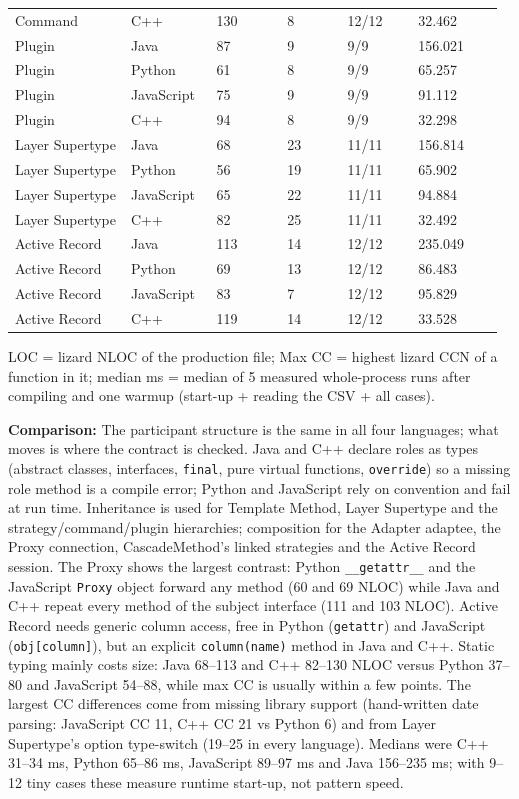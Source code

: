 \documentclass[11pt,a4paper]{article}
\newcommand{\field}[2]{\textbf{#1:} #2\par}
\begin{document}
{\begin{longtable}{@{}P{0.23\linewidth}P{0.17\linewidth}P{0.14\linewidth}P{0.12\linewidth}P{0.14\linewidth}P{0.17\linewidth}@{}}
Command & C++ & 130 & 8 & 12/12 & 32.462 \\
Plugin & Java & 87 & 9 & 9/9 & 156.021 \\
Plugin & Python & 61 & 8 & 9/9 & 65.257 \\
Plugin & JavaScript & 75 & 9 & 9/9 & 91.112 \\
Plugin & C++ & 94 & 8 & 9/9 & 32.298 \\
Layer Supertype & Java & 68 & 23 & 11/11 & 156.814 \\
Layer Supertype & Python & 56 & 19 & 11/11 & 65.902 \\
Layer Supertype & JavaScript & 65 & 22 & 11/11 & 94.884 \\
Layer Supertype & C++ & 82 & 25 & 11/11 & 32.492 \\
Active Record & Java & 113 & 14 & 12/12 & 235.049 \\
Active Record & Python & 69 & 13 & 12/12 & 86.483 \\
Active Record & JavaScript & 83 & 7 & 12/12 & 95.829 \\
Active Record & C++ & 119 & 14 & 12/12 & 33.528 \\
\bottomrule\end{longtable}}
LOC = lizard NLOC of the production file; Max CC = highest lizard CCN of a function in it; median ms = median of 5 measured whole-process runs after compiling and one warmup (start-up + reading the CSV + all cases).\par
\field{Comparison}{The participant structure is the same in all four languages; what moves is where the contract is checked. Java and C++ declare roles as types (abstract classes, interfaces, \texttt{final}, pure virtual functions, \texttt{override}) so a missing role method is a compile error; Python and JavaScript rely on convention and fail at run time. Inheritance is used for Template Method, Layer Supertype and the strategy/command/plugin hierarchies; composition for the Adapter adaptee, the Proxy connection, CascadeMethod's linked strategies and the Active Record session. The Proxy shows the largest contrast: Python \texttt{\_\allowbreak{}\_\allowbreak{}getattr\_\allowbreak{}\_\allowbreak{}} and the JavaScript \texttt{Proxy} object forward any method (60 and 69 NLOC) while Java and C++ repeat every method of the subject interface (111 and 103 NLOC). Active Record needs generic column access, free in Python (\texttt{getattr}) and JavaScript (\texttt{obj[column]}), but an explicit \texttt{column(name)} method in Java and C++. Static typing mainly costs size: Java 68--113 and C++ 82--130 NLOC versus Python 37--80 and JavaScript 54--88, while max CC is usually within a few points. The largest CC differences come from missing library support (hand-written date parsing: JavaScript CC 11, C++ CC 21 vs Python 6) and from Layer Supertype's option type-switch (19--25 in every language). Medians were C++ 31--34 ms, Python 65--86 ms, JavaScript 89--97 ms and Java 156--235 ms; with 9--12 tiny cases these measure runtime start-up, not pattern speed.}
\end{document}
